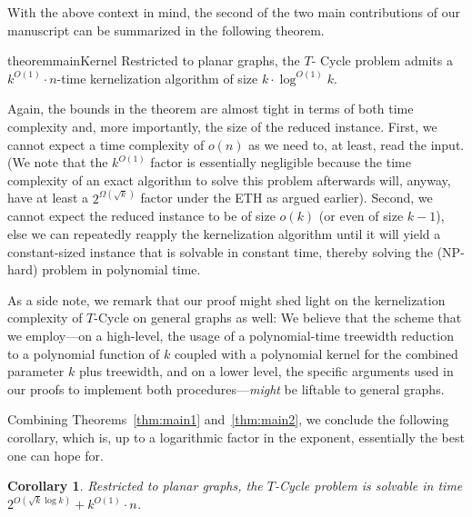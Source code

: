 \documentclass{article}
\newtheorem{corollary}[theorem]{Corollary}
\numberwithin{claimcounter}{lemma}
\begin{document}
With the above context in mind, the second of the two  main contributions of our manuscript can be summarized in the following theorem. 



\begin{restatable}{theorem}{mainKernel}\label{thm:main2}
Restricted to planar graphs, the {\sc $T$- Cycle} problem admits a $k^{O(1)}\cdot n$-time kernelization algorithm of size $k\cdot \log^{O(1)}k$.
\end{restatable}

Again, the bounds in the theorem are almost tight in terms of both time complexity and, more importantly, the size of the reduced instance. First, we cannot expect a time complexity of $o(n)$ as we need to, at least, read the input. (We note that the $k^{O(1)}$ factor is essentially negligible because the time complexity of an exact algorithm to solve this problem afterwards will, anyway, have at least a $2^{\Omega(\sqrt{k})}$ factor under the ETH as argued earlier). Second, we cannot expect the reduced instance to be of size $o(k)$ (or even of size $k-1$), else we can repeatedly reapply the kernelization algorithm until it will yield a constant-sized instance that is solvable in constant time, thereby solving the (NP-hard) problem in polynomial time.

As a side note, we remark that our proof might shed light on the kernelization complexity of {\sc $T$-Cycle} on general graphs as well: We believe that the scheme that we employ---on a high-level, the usage of a polynomial-time treewidth reduction to a polynomial function of $k$ coupled with a polynomial kernel for the combined parameter $k$ plus treewidth, and on a lower level, the specific arguments used in our proofs to implement both procedures---{\em might} be liftable to general graphs.

Combining Theorems~\ref{thm:main1} and~\ref{thm:main2}, we conclude the following corollary, which is, up to a logarithmic factor in the exponent, essentially the best one can hope for.

\begin{corollary}
Restricted to planar graphs, the {\sc $T$-Cycle} problem is solvable in time $2^{O(\sqrt{k}\log k)} + k^{O(1)}\cdot n$.
\end{corollary}
\end{document}
